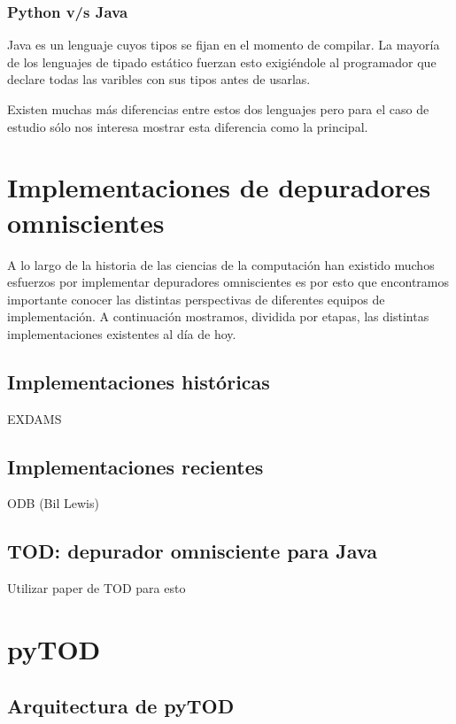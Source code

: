 \documentclass[12pt,a4paper]{report}
\begin{document}
\begin{itemize}
		\subsection{Python v/s Java}

Java es un lenguaje cuyos tipos se fijan en el momento de compilar. La mayoría de los lenguajes de tipado estático fuerzan esto exigiéndole al programador que declare todas las varibles con sus tipos antes de usarlas. 

Existen muchas más diferencias entre estos dos lenguajes pero para el caso de estudio sólo nos interesa mostrar esta diferencia como la principal.

\chapter{Implementaciones de depuradores omniscientes}

	A lo largo de la historia de las ciencias de la computación han existido muchos esfuerzos por implementar depuradores omniscientes es por esto que encontramos importante conocer las distintas perspectivas de diferentes equipos de implementación.  A continuación mostramos, dividida por etapas, las distintas implementaciones existentes al día de hoy.

	\section{Implementaciones históricas}

EXDAMS

	\section{Implementaciones recientes}

ODB (Bil Lewis)

	\section{TOD: depurador omnisciente para Java}

Utilizar paper de TOD para esto

\chapter{pyTOD}
	\section{Arquitectura de pyTOD}

\end{itemize}
\end{document}
